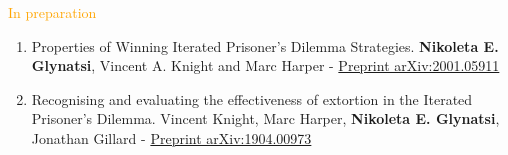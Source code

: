 \documentclass{beamer}
\begin{document}
\begin{frame}
    \footnotesize{\textcolor{orange}{In preparation}}
    \tiny{
    \begin{enumerate} \def\labelenumi{\arabic{enumi}.}
    \item Properties of Winning Iterated Prisoner's Dilemma Strategies. \textbf{Nikoleta E. Glynatsi}, Vincent A. Knight
    and Marc Harper
    - \href{https://arxiv.org/abs/2001.05911}{Preprint arXiv:2001.05911}
    \item Recognising and evaluating the effectiveness of extortion in
    the Iterated Prisoner's Dilemma. Vincent Knight, Marc Harper, \textbf{Nikoleta E. Glynatsi},
    Jonathan Gillard -
    \href{https://arxiv.org/abs/1904.00973}{Preprint arXiv:1904.00973}
    \end{enumerate}
    }
\end{frame}
\end{document}
